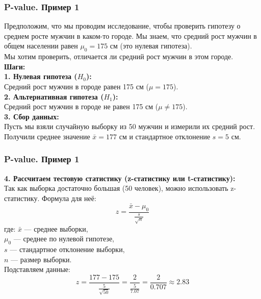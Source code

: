 \documentclass[aspectratio=169]{beamer}
\begin{document}
\begin{frame}
\frametitle{P-value. Пример 1}
Предположим, что мы проводим исследование, чтобы проверить гипотезу о среднем росте мужчин в каком-то городе. Мы знаем, что средний рост мужчин в общем населении равен \( \mu_0 = 175 \) см (это нулевая гипотеза).\\
Мы хотим проверить, отличается ли средний рост мужчин в этом городе.\\
{\bf Шаги:}\\
{\bf 1. Нулевая гипотеза (\( H_0 \)):}\\
Средний рост мужчин в городе равен 175 см (\( \mu = 175 \)).\\
{\bf 2. Альтернативная гипотеза (\( H_1 \)):}\\
Средний рост мужчин в городе не равен 175 см (\( \mu \neq 175 \)).\\
{\bf 3. Сбор данных:}\\
Пусть мы взяли случайную выборку из 50 мужчин и измерили их средний рост. Получили среднее значение \( \bar{x} = 177 \) см и стандартное отклонение \( s = 5 \) см.\\
\end{frame}

\begin{frame}
\frametitle{P-value. Пример 1}
{\bf 4. Рассчитаем тестовую статистику (z-статистику или t-статистику):}\\
Так как выборка достаточно большая (50 человек), можно использовать z-статистику. Формула для неё:
   \[
   z = \frac{\bar{x} - \mu_0}{\frac{s}{\sqrt{n}}}
   \]
где:
\quad \( \bar{x} \) — среднее выборки,\\
\quad \( \mu_0 \) — среднее по нулевой гипотезе,\\
\quad \( s \) — стандартное отклонение выборки,\\
\quad \( n \) — размер выборки.\\
Подставляем данные:
   \[
   z = \frac{177 - 175}{\frac{5}{\sqrt{50}}} = \frac{2}{\frac{5}{7.07}} = \frac{2}{0.707} \approx 2.83
   \]
\end{frame}
\end{document}
